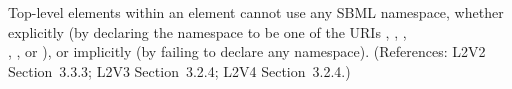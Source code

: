 Top-level elements within an  element cannot use any SBML
namespace, whether explicitly (by declaring the namespace to be one of the
URIs ,
, 
,\\
, 
, or
), or implicitly (by failing
to declare any namespace).  (References: L2V2 Section~3.3.3; L2V3
Section~3.2.4; L2V4 Section~3.2.4.)

